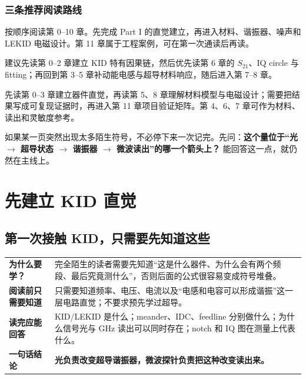\documentclass[11pt,a4paper,openany]{ctexrep}
\newcommand{\chapterguide}[4]{%
\begin{tcolorbox}[
  enhanced,
  breakable,
  colback=KidGray!45,
  colframe=KidBlue!65,
  boxrule=0.8pt,
  arc=2mm,
  title=本章导航,
  fonttitle=\bfseries,
  before skip=0.7em,
  after skip=1.0em]
\renewcommand{\arraystretch}{1.18}
\begin{tabularx}{\textwidth}{>{\bfseries\color{KidBlue}}p{3.0cm} X}
为什么要学？ & #1 \\
阅读前只需要知道 & #2 \\
读完应能回答 & #3 \\
一句话结论 & \textbf{#4} \\
\end{tabularx}
\end{tcolorbox}%
}
\begin{document}
\section*{三条推荐阅读路线}
\begin{tcolorbox}[colback=white,colframe=KidBlue!55,arc=2mm,title=路线 A：完全初学者,fonttitle=\bfseries]
按顺序阅读第 0--10 章。先完成 Part I 的直觉建立，再进入材料、谐振器、噪声和 LEKID 电磁设计。第 11 章属于工程案例，可在第一次通读后再读。
\end{tcolorbox}

\begin{tcolorbox}[colback=white,colframe=KidTeal!65,arc=2mm,title=路线 B：已有 RF / 微波背景,fonttitle=\bfseries]
建议先读第 0--2 章建立 KID 特有因果链，然后优先读第 6 章的 $S_{21}$、IQ circle 与 fitting；再回到第 3--5 章补动能电感与超导材料响应，随后进入第 7--8 章。
\end{tcolorbox}

\begin{tcolorbox}[colback=white,colframe=KidGold!80!black,arc=2mm,title=路线 C：主要目标是 LEKID 仿真与器件设计,fonttitle=\bfseries]
先读第 0--3 章建立器件直觉，再读第 5、8 章理解材料模型与电磁设计；需要把结果写成可复现证据时，再进入第 11 章项目验证矩阵。第 4、6、7 章可作为材料、读出和灵敏度参考。
\end{tcolorbox}

\begin{checkpointbox}
如果某一页突然出现太多陌生符号，不必停下来一次记完。先问：\textbf{这个量位于“光 $\rightarrow$ 超导状态 $\rightarrow$ 谐振器 $\rightarrow$ 微波读出”的哪一个箭头上？} 能回答这一点，就仍然在主线上。
\end{checkpointbox}

\part{先建立 KID 直觉}
\setcounter{chapter}{-1}
\chapter{第一次接触 KID，只需要先知道这些}
\chapterguide
{完全陌生的读者需要先知道“这是什么器件、为什么会有两个频段、最后究竟测什么”，否则后面的公式很容易变成符号堆叠。}
{只需要知道频率、电压、电流以及“电感和电容可以形成谐振”这一层电路直觉；不要求预先学过超导。}
{KID/LEKID 是什么；meander、IDC、feedline 分别做什么；为什么信号光与 GHz 读出可以同时存在；notch 和 IQ 图在测量上代表什么。}
{光负责改变超导谐振器，微波探针负责把这种改变读出来。}
\end{document}
